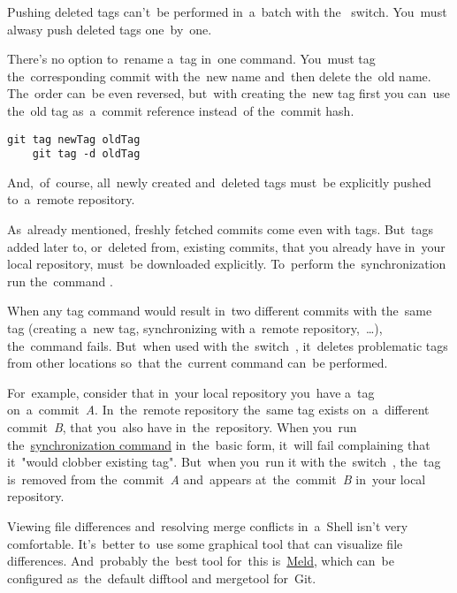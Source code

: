 \note Pushing deleted tags can't~be performed in~a~batch with the~ switch. You~must alwasy push deleted tags one~by~one.

There's no option to~rename a~tag in~one command. You~must tag the~corresponding commit with the~new name and~then delete the~old name. The~order can~be even reversed, but~with creating the~new tag first you can~use the~old tag as~a~commit reference instead~of the~commit hash.

\begin{lstlisting}[frame=no]
    git tag newTag oldTag
    git tag -d oldTag
\end{lstlisting}

\noindent And,~of~course, all~newly created and~deleted tags must~be explicitly pushed to~a~remote repository.

\label{gittagsynchronization}
As~already mentioned, freshly fetched commits come even with tags. But~tags added later to, or~deleted from, existing commits, that you already have in~your local repository, must~be downloaded explicitly. To~perform the~synchronization run the~command .

When any tag command would result in~two different commits with the~same tag (creating a~new tag, synchronizing with a~remote repository,~\dots), the~command fails. But~when used with the~switch~, it~deletes problematic tags from other locations so~that the~current command can~be performed.

For~example, consider that in~your local repository you~have a~tag on~a~commit~\textit{A}. In~the~remote repository the~same tag exists on~a~different commit~\textit{B}, that you~also have in~the~repository. When you~run the~\hyperref[gittagsynchronization]{synchronization command} in~the~basic form, it~will fail complaining that it~"would clobber existing tag". But~when you~run it with the~switch~, the~tag is~removed from the~commit~\textit{A} and~appears at~the~commit~\textit{B} in~your local repository.

Viewing file differences and~resolving merge conflicts in~a~Shell isn't very comfortable. It's~better to~use some graphical tool that can visualize file differences. And~probably the~best tool for~this is~\href{https://meldmerge.org/}{Meld}, which can~be configured as~the~default difftool and mergetool for~Git.

